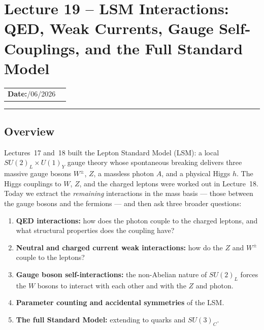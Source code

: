 
\section{Lecture 19 -- LSM Interactions: QED, Weak Currents, Gauge Self-Couplings, and the Full Standard Model}\label{sec:lec19}
\begin{center}
\begin{tabular}{ll}
  \textbf{Date:}\quad 18/06/2026 & \\
\end{tabular}
\end{center}
\hrule\vspace{1.5em}

\subsection{Overview}\label{subsec:lec19:overview}

Lectures~17 and~18 built the Lepton Standard Model (LSM): a local
$SU(2)_L\times U(1)_Y$ gauge theory whose spontaneous breaking delivers
three massive gauge bosons $W^\pm$, $Z$, a massless photon $A$, and a
physical Higgs $h$. The Higgs couplings to $W$, $Z$, and the charged
leptons were worked out in Lecture~18. Today we extract the
\emph{remaining} interactions in the mass basis --- those between the
gauge bosons and the fermions --- and then ask three broader questions:

\begin{enumerate}
  \item \textbf{QED interactions:} how does the photon couple to
        the charged leptons, and what structural properties does the
        coupling have?
  \item \textbf{Neutral and charged current weak interactions:} how
        do the $Z$ and $W^\pm$ couple to the leptons?
  \item \textbf{Gauge boson self-interactions:} the non-Abelian nature
        of $SU(2)_L$ forces the $W$ bosons to interact with each
        other and with the $Z$ and photon.
  \item \textbf{Parameter counting and accidental symmetries} of the LSM.
  \item \textbf{The full Standard Model:} extending to quarks and $SU(3)_C$.
\end{enumerate}

